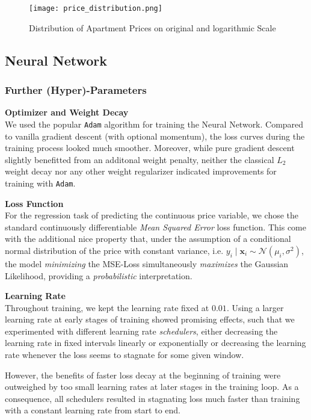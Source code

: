 \begin{figure}[ht]
  \centering
  \texttt{[image: price\_distribution.png]}
  \caption{Distribution of Apartment Prices on original and logarithmic Scale}
  \label{fig:price-distribution}
\end{figure}


\subsection{Neural Network}

\subsubsection{Further (Hyper)-Parameters} \label{appendix:hyperparameters}

\textbf{Optimizer and Weight Decay} \\
We used the popular \texttt{Adam} algorithm \citep{kingma2017} for training the Neural Network.
Compared to vanilla gradient descent (with optional momentum), the loss curves during the training process looked much smoother.
Moreover, while pure gradient descent slightly benefitted from an additonal weight penalty, neither the classical $L_2$ weight decay nor any other weight regularizer indicated improvements for training with \texttt{Adam}.

\textbf{Loss Function} \\
For the regression task of predicting the continuous price variable, we chose the standard continuously differentiable \emph{Mean Squared Error} loss function.
This come with the additional nice property that, under the assumption of a conditional normal distribution of the price with constant variance, i.e. $y_i \mid \mathbf{x}_i \sim \mathcal{N} \left(\mu_i, \sigma^2 \right)$, the model \emph{minimizing} the MSE-Loss simultaneously \emph{maximizes} the Gaussian Likelihood, providing a \emph{probabilistic} interpretation.

\textbf{Learning Rate} \\
Throughout training, we kept the learning rate fixed at $0.01$.
Using a larger learning rate at early stages of training showed promising effects, such that we experimented with different learning rate \emph{schedulers}, either decreasing the learning rate in fixed intervals linearly or exponentially or decreasing the learning rate whenever the loss seems to stagnate for some given window.

However, the benefits of faster loss decay at the beginning of training were outweighed by too small learning rates at later stages in the training loop.
As a consequence, all schedulers resulted in stagnating loss much faster than training with a constant learning rate from start to end.

